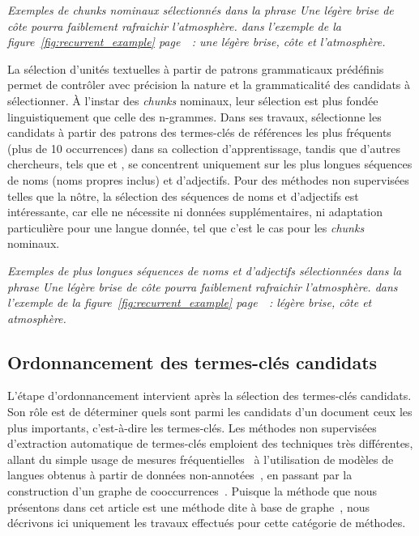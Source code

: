     \textit{Exemples de \textit{chunks} nominaux sélectionnés dans la phrase \og{}Une
    légère brise de côte pourra faiblement rafraichir l'atmosphère.\fg{} dans
    l'exemple de la figure~\ref{fig:recurrent_example}
    page~\pageref{fig:recurrent_example}~: \og{}une légère brise\fg{},
    \og{}côte\fg{} et \og{}l'atmosphère\fg{}.}

    La sélection d'unités textuelles à partir de patrons grammaticaux prédéfinis
    permet de contrôler avec précision la nature et la grammaticalité des
    candidats à sélectionner. À l'instar des \textit{chunks} nominaux, leur
    sélection est plus fondée linguistiquement que celle des n-grammes. Dans ses
    travaux,  sélectionne les candidats à
    partir des patrons des termes-clés de références les plus fréquents (plus de
    10 occurrences) dans sa collection d'apprentissage, tandis que d'autres
    chercheurs, tels que  et
    , se concentrent uniquement sur les plus
    longues séquences de noms (noms propres inclus) et d'adjectifs. Pour des
    méthodes non supervisées telles que la nôtre, la sélection des séquences de
    noms et d'adjectifs est intéressante, car elle ne nécessite ni données
    supplémentaires, ni adaptation particulière pour une langue donnée, tel que
    c'est le cas pour les \textit{chunks} nominaux.

    \textit{Exemples de plus longues séquences de noms et d'adjectifs
    sélectionnées dans la phrase \og{}Une légère brise de côte pourra faiblement
    rafraichir l'atmosphère.\fg{} dans l'exemple de la
    figure~\ref{fig:recurrent_example} page~\pageref{fig:recurrent_example}~:
    \og{}légère brise\fg{}, \og{}côte\fg{} et \og{}atmosphère\fg{}.}

  \subsection{Ordonnancement des termes-clés candidats}
  \label{subsec:ordonnancement_des_termes_cles_candidats}
    L'étape d'ordonnancement intervient après la sélection des termes-clés
    candidats. Son rôle est de déterminer quels sont parmi les candidats d'un
    document ceux les plus importants, c'est-à-dire les termes-clés.
    Les méthodes non supervisées d'extraction automatique de termes-clés
    emploient des techniques très différentes, allant du simple usage de mesures
    fréquentielles~\cite{paukkeri2010likey} à l'utilisation de modèles de
    langues obtenus à partir de données
    non-annotées~\cite{tomokiyo2003languagemodel}, en passant par la
    construction d'un graphe de cooccurrences~\cite{mihalcea2004textrank}.
    Puisque la méthode que nous présentons dans cet article est une méthode dite
    \og à base de graphe~\fg, nous décrivons ici uniquement les travaux
    effectués pour cette catégorie de méthodes.

